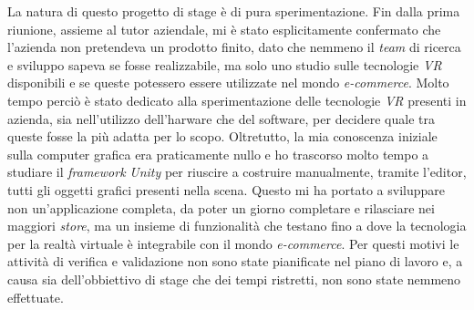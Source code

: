 La natura di questo progetto di stage è di pura sperimentazione. Fin dalla prima riunione, assieme al tutor aziendale, mi è stato esplicitamente confermato che l'azienda non pretendeva un prodotto finito, dato che nemmeno il \textit{team} di ricerca e sviluppo sapeva se fosse realizzabile, ma solo uno studio sulle tecnologie \textit{VR} disponibili e se queste potessero essere utilizzate nel mondo \textit{e-commerce}. Molto tempo perciò è stato dedicato alla sperimentazione delle tecnologie \textit{VR} presenti in azienda, sia nell'utilizzo dell'harware che del software, per decidere quale tra queste fosse la più adatta per lo scopo. Oltretutto, la mia conoscenza iniziale sulla computer grafica era praticamente nullo e ho trascorso molto tempo a studiare il \textit{framework} \textit{Unity} per riuscire a costruire manualmente, tramite l'editor, tutti gli oggetti grafici presenti nella scena. Questo mi ha portato a sviluppare non un'applicazione completa, da poter un giorno completare e rilasciare nei maggiori \textit{store}, ma un insieme di funzionalità che testano fino a dove la tecnologia per la realtà virtuale è integrabile con il mondo \textit{e-commerce}. Per questi motivi le attività di verifica e validazione non sono state pianificate nel piano di lavoro e, a causa sia dell'obbiettivo di stage che dei tempi ristretti, non sono state nemmeno effettuate. 